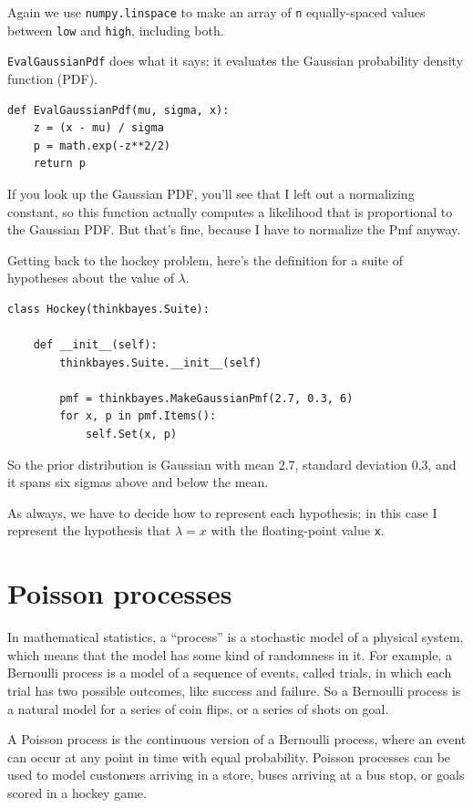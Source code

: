 \documentclass[12pt]{book}
\begin{document}
Again we use {\tt numpy.linspace} to make an array of {\tt n}
equally-spaced values between {\tt low} and {\tt high}, including
both.

\verb"EvalGaussianPdf" does what it says; it evaluates the
Gaussian probability density function (PDF).

\begin{verbatim}
def EvalGaussianPdf(mu, sigma, x):
    z = (x - mu) / sigma
    p = math.exp(-z**2/2)
    return p
\end{verbatim}  

If you look up the Gaussian PDF, you'll see that I left out a
normalizing constant, so this function actually computes
a likelihood that is proportional to the Gaussian PDF.  But
that's fine, because I have to normalize the Pmf anyway.

Getting back to the hockey problem, here's the definition for a suite
of hypotheses about the value of $\lambda$.

\begin{verbatim}
class Hockey(thinkbayes.Suite):

    def __init__(self):
        thinkbayes.Suite.__init__(self)

        pmf = thinkbayes.MakeGaussianPmf(2.7, 0.3, 6)
        for x, p in pmf.Items():
            self.Set(x, p)
\end{verbatim}  

So the prior distribution is Gaussian with mean 2.7, standard deviation
0.3, and it spans six sigmas above and below the mean.

As always, we have to decide how to represent each hypothesis; in
this case I represent the hypothesis that $\lambda=x$ with the
floating-point value {\tt x}. 


\section{Poisson processes}

In mathematical statistics, a ``process'' is a stochastic model of a
physical system, which means that the model has some kind of
randomness in it.  For example, a Bernoulli process is a model of a
sequence of events, called trials, in which each trial has two
possible outcomes, like success and failure.  So a Bernoulli process
is a natural model for a series of coin flips, or a series of shots on
goal.   

A Poisson process is the continuous version of a Bernoulli process,
where an event can occur at any point in time with equal probability.
Poisson processes can be used to model customers arriving in a store,
buses arriving at a bus stop, or goals scored in a hockey game.
\end{document}
